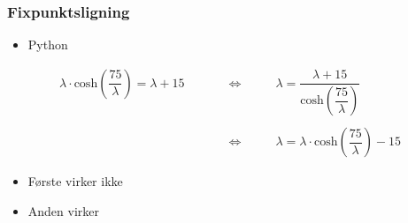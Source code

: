 \begin{frame}
\frametitle{Fixpunktsligning}
\center
%
\begin{itemize}
\item Python
\end{itemize}
%
\begin{align*}
\lambda \cdot \text{cosh}(\dfrac{75}{\lambda})=\lambda+15 
\phantom{HHH} & \Leftrightarrow \phantom{HHH}
\lambda=\dfrac{\lambda+15}{\text{cosh}(\dfrac{75}{\lambda})} \\
\\
 \phantom{HHH} & \Leftrightarrow \phantom{HHH}
\lambda = \lambda \cdot \text{cosh}(\dfrac{75}{\lambda})-15  
\end{align*}
\begin{itemize}
\item Første virker ikke 
\item Anden virker 
\end{itemize}
\end{frame}
